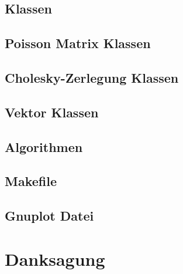 \section{Klassen}
\section{Poisson Matrix Klassen}
\section{Cholesky-Zerlegung Klassen}
\section{Vektor Klassen}
\section{Algorithmen}
\section{Makefile}
\section{Gnuplot Datei}

\chapter*{Danksagung}

